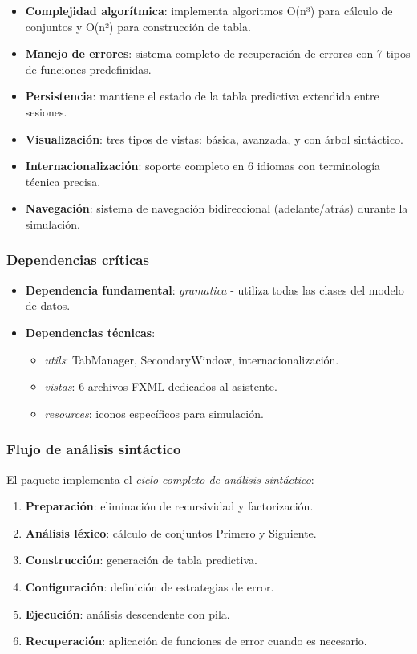 \begin{itemize}
    \item \textbf{Complejidad algorítmica}: implementa algoritmos O(n³) para cálculo de conjuntos y O(n²) para construcción de tabla.
    \item \textbf{Manejo de errores}: sistema completo de recuperación de errores con 7 tipos de funciones predefinidas.
    \item \textbf{Persistencia}: mantiene el estado de la tabla predictiva extendida entre sesiones.
    \item \textbf{Visualización}: tres tipos de vistas: básica, avanzada, y con árbol sintáctico.
    \item \textbf{Internacionalización}: soporte completo en 6 idiomas con terminología técnica precisa.
    \item \textbf{Navegación}: sistema de navegación bidireccional (adelante/atrás) durante la simulación.
\end{itemize}

\subsubsection{Dependencias críticas}

\begin{itemize}
    \item \textbf{Dependencia fundamental}: \textit{gramatica} - utiliza todas las clases del modelo de datos.
    \item \textbf{Dependencias técnicas}:
    \begin{itemize}
        \item \textit{utils}: TabManager, SecondaryWindow, internacionalización.
        \item \textit{vistas}: 6 archivos FXML dedicados al asistente.
        \item \textit{resources}: iconos específicos para simulación.
    \end{itemize}
\end{itemize}

\subsubsection{Flujo de análisis sintáctico}

El paquete implementa el \textit{ciclo completo de análisis sintáctico}:

\begin{enumerate}
    \item \textbf{Preparación}: eliminación de recursividad y factorización.
    \item \textbf{Análisis léxico}: cálculo de conjuntos Primero y Siguiente.
    \item \textbf{Construcción}: generación de tabla predictiva.
    \item \textbf{Configuración}: definición de estrategias de error.
    \item \textbf{Ejecución}: análisis descendente con pila.
    \item \textbf{Recuperación}: aplicación de funciones de error cuando es necesario.
\end{enumerate}

